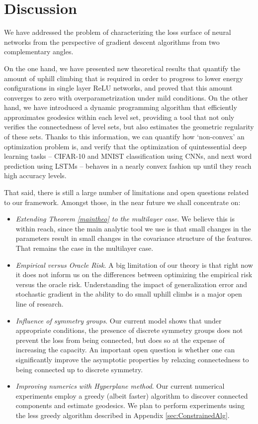 \section{Discussion}
\label{sec:Discussion}

We have addressed the problem of characterizing the loss surface of neural networks from the perspective
of gradient descent algorithms from two complementary angles. 

On the one hand, we have presented new theoretical results that quantify 
the amount of uphill climbing that is required in order to progress to lower energy configurations in 
single layer ReLU networks, and proved that this amount converges to zero with overparametrization under mild conditions. On the other hand, we have introduced a dynamic programming algorithm that efficiently approximates geodesics within each level set, providing a tool that not only verifies the connectedness of level sets, but also estimates the geometric regularity of these sets. Thanks to this information, we can quantify how `non-convex' an optimization problem is, and verify that the optimization of quintessential deep learning tasks -- CIFAR-10 and MNIST classification using CNNs, and next word prediction using LSTMs -- behaves in a nearly convex fashion up until they reach high accuracy levels.

That said, there is still a large number of limitations and open questions related to our framework. Amongst those, in the near future we shall concentrate on:
\begin{itemize}
\item \emph{Extending Theorem \ref{maintheo} to the multilayer case}. We believe this is within reach, since the main analytic tool we use is that small changes in the parameters result in small changes in the covariance structure of the features. That remains the case in the multilayer case. 
\item \emph{Empirical versus Oracle Risk}. A big limitation of our theory is that right now it does not inform us on the differences between optimizing the empirical risk versus the oracle risk. Understanding the impact of generalization error and stochastic gradient in the ability to do small uphill climbs is a major open line of research.
\item \emph{Influence of symmetry groups}. Our current model shows that under appropriate conditions, the presence of discrete symmetry groups does not prevent the loss from being connected, but does so at the expense of increasing the capacity. An important open question is whether one can significantly improve the asymptotic properties by relaxing connectedness to being connected up to discrete symmetry. 
\item \emph{Improving numerics with Hyperplane method}. Our current numerical experiments employ a greedy (albeit faster) algorithm to discover connected components and estimate geodesics. We plan to perform experiments using the less greedy algorithm described in Appendix \ref{sec:ConstrainedAlg}. 
\end{itemize}
 

%
